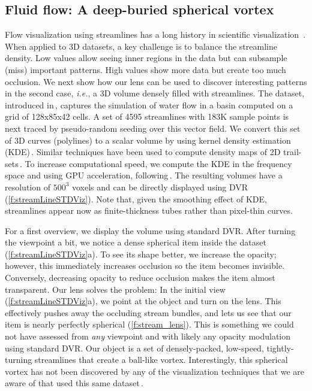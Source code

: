 \subsection{Fluid flow: A deep-buried spherical vortex}
\label{sec:flow}
%
%
Flow visualization using streamlines has a long history in scientific visualization~\cite{brambilla2012illustrative,xxx}. When applied to 3D datasets, a key challenge is to balance the streamline density. Low values allow seeing inner regions in the data but can subsample (miss) important patterns. High values show more data but create too much occlusion. We next show how our lens can be used to discover interesting patterns in the second case, \emph{i.e.}, a 3D volume densely filled with streamlines. The dataset, introduced in\,\cite{griebel2004flow}, captures the simulation of water flow in a basin computed on a grid of 128x85x42 cells. A set of 4595 streamlines with 183K sample points is next traced by pseudo-random seeding over this vector field. We convert this set of 3D curves (polylines) to a scalar volume by using kernel density estimation (KDE)\,\cite{silverman1986density}. Similar techniques have been used to compute density maps of 2D trail-sets\,\cite{hurter2012graph,cubu,hurter2015image}. To increase computational speed, we compute the KDE in the frequency space and using GPU acceleration, following\,\cite{lhuillier2017ffteb}. The resulting volumes have a resolution of $500^3$ voxels and can be directly displayed using DVR (\autoref{f:streamLineSTDViz}). Note that, given the smoothing effect of KDE, streamlines appear now as finite-thickness tubes rather than pixel-thin curves.

For a first overview, we display the volume using standard DVR. After turning the viewpoint a bit, we notice a dense spherical item inside the dataset (\autoref{f:streamLineSTDViz}a). To see its shape better, we increase the opacity; however, this immediately increases occlusion so the item becomes invisible. Conversely, decreasing opacity to reduce occlusion makes the item almost transparent. Our lens solves the problem: In the initial view (\autoref{f:streamLineSTDViz}a), we point at the object and turn on the lens. This effectively pushes away the occluding stream bundles, and lets us see that our item is nearly perfectly spherical (\autoref{f:stream_lens}). This is something we could not have assessed from \emph{any} viewpoint and with likely any opacity modulation using standard DVR. Our object is a set of densely-packed, low-speed, tightly-turning streamlines that create a ball-like vortex. Interestingly, this spherical vortex has not been discovered by any of the visualization techniques that we are aware of that used this same dataset\,\cite{telea_vis_99,griebel2004flow,ddh,lhuillier2017ffteb,maybe_more}.



